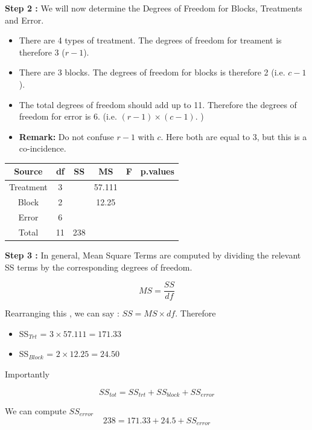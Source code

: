 \documentclass[]{article}
\begin{document}
\bigskip

\noindent \textbf{Step 2 :} We will now determine the Degrees of Freedom for Blocks, Treatments and Error.

\begin{itemize}
	\item There are 4 types of treatment. The degrees of freedom for treament is therefore 3 ($r-1$).
	\item There are 3 blocks. The degrees of freedom for blocks is therefore 2 (i.e. $c-1$). 
	\item The total degrees of freedom should add up to 11. Therefore the degrees of freedom for error is 6.
	(i.e. $(r-1)\times (c-1)$. )
	\item \textbf{Remark:} Do not confuse $r-1$ with $c$. Here both are equal to 3, but this is a co-incidence.
\end{itemize}

{
	\Large
	\begin{center}
\begin{tabular}{|c|c|c|c|c|c|}
\hline Source	       &	df	&	SS	&	MS	&	F	&	p.values	\\ \hline
Treatment      &	3	&		&	57.111	& \phantom{spa} \phantom{spa}		&	\phantom{spa}	\\ \hline
Block	&	2	&		&	12.25	&		&		\\ \hline
Error	&	6	&	\phantom{spa}	&		&		&		\\ \hline 
Total	&	11	&	238	&		&		&		\\ \hline 
\end{tabular}
\end{center}
}


\newpage


\noindent \textbf{Step 3 :} In general, Mean Square Terms are computed by dividing the relevant SS terms by the corresponding degrees of freedom.

\[ MS = \frac{SS}{df} \]

\noindent Rearranging this , we can say : $SS = MS \times df$. Therefore

\begin{itemize}
	\item SS$_{Trt}$ = $3 \times 57.111 = 171.33 $
	\item SS$_{Block}$ = $2 \times 12.25 = 24.50$
\end{itemize}

Importantly 
\begin{framed}
	\[ SS_{tot} = SS_{trt} + SS_{block} +  SS_{error}\]
\end{framed}
We can compute $SS_{error}$
\[ 238 = 171.33 + 24.5 + SS_{error} \]
\end{document}
